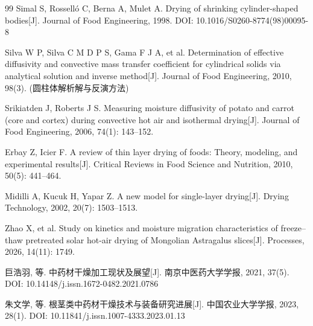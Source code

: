 \begin{thebibliography}{99}
Simal S, Rossell\'o C, Berna A, Mulet A. Drying of shrinking cylinder-shaped
bodies[J]. Journal of Food Engineering, 1998.
DOI: 10.1016/S0260-8774(98)00095-8

Silva W P, Silva C M D P S, Gama F J A, et al. Determination of effective
diffusivity and convective mass transfer coefficient for cylindrical solids via
analytical solution and inverse method[J]. Journal of Food Engineering, 2010,
98(3). (圆柱体解析解与反演方法)

Srikiatden J, Roberts J S. Measuring moisture diffusivity of potato and carrot
(core and cortex) during convective hot air and isothermal drying[J].
Journal of Food Engineering, 2006, 74(1): 143--152.

Erbay Z, Icier F. A review of thin layer drying of foods: Theory, modeling, and
experimental results[J]. Critical Reviews in Food Science and Nutrition, 2010,
50(5): 441--464.

Midilli A, Kucuk H, Yapar Z. A new model for single-layer drying[J].
Drying Technology, 2002, 20(7): 1503--1513.

Zhao X, et al. Study on kinetics and moisture migration characteristics of
freeze--thaw pretreated solar hot-air drying of Mongolian Astragalus slices[J].
Processes, 2026, 14(11): 1749.

巨浩羽, 等. 中药材干燥加工现状及展望[J]. 南京中医药大学学报, 2021, 37(5).
DOI: 10.14148/j.issn.1672-0482.2021.0786

朱文学, 等. 根茎类中药材干燥技术与装备研究进展[J]. 中国农业大学学报, 2023, 28(1).
DOI: 10.11841/j.issn.1007-4333.2023.01.13

\end{thebibliography}
